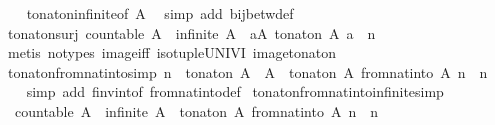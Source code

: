\begin{isabellebody}
%
\isadelimproof
\ \ %
\endisadelimproof
%
\isatagproof
{}\isamarkupfalse%
\ to{\isacharunderscore}nat{\isacharunderscore}on{\isacharunderscore}infinite{\isacharbrackleft}of\ A{\isacharbrackright}\ \isamarkupfalse%
\ {\isacharparenleft}simp\ add{\isacharcolon}\ bij{\isacharunderscore}betw{\isacharunderscore}def{\isacharparenright}%
\endisatagproof
{\isafoldproof}%
%
\isadelimproof
\isanewline
%
\endisadelimproof
\isanewline
{}\isamarkupfalse%
\ to{\isacharunderscore}nat{\isacharunderscore}on{\isacharunderscore}surj{\isacharcolon}\ {\isachardoublequoteopen}countable\ A\ {\isasymLongrightarrow}\ infinite\ A\ {\isasymLongrightarrow}\ {\isasymexists}a{\isasymin}A{\isachardot}\ to{\isacharunderscore}nat{\isacharunderscore}on\ A\ a\ {\isacharequal}\ n{\isachardoublequoteclose}\isanewline
%
\isadelimproof
\ \ %
\endisadelimproof
%
\isatagproof
{}\isamarkupfalse%
\ {\isacharparenleft}metis\ {\isacharparenleft}no{\isacharunderscore}types{\isacharparenright}\ image{\isacharunderscore}iff\ iso{\isacharunderscore}tuple{\isacharunderscore}UNIV{\isacharunderscore}I\ image{\isacharunderscore}to{\isacharunderscore}nat{\isacharunderscore}on{\isacharparenright}%
\endisatagproof
{\isafoldproof}%
%
\isadelimproof
\isanewline
%
\endisadelimproof
\isanewline
{}\isamarkupfalse%
\ to{\isacharunderscore}nat{\isacharunderscore}on{\isacharunderscore}from{\isacharunderscore}nat{\isacharunderscore}into{\isacharbrackleft}simp{\isacharbrackright}{\isacharcolon}\ {\isachardoublequoteopen}n\ {\isasymin}\ to{\isacharunderscore}nat{\isacharunderscore}on\ A\ {\isacharbackquote}\ A\ {\isasymLongrightarrow}\ to{\isacharunderscore}nat{\isacharunderscore}on\ A\ {\isacharparenleft}from{\isacharunderscore}nat{\isacharunderscore}into\ A\ n{\isacharparenright}\ {\isacharequal}\ n{\isachardoublequoteclose}\isanewline
%
\isadelimproof
\ \ %
\endisadelimproof
%
\isatagproof
{}\isamarkupfalse%
\ {\isacharparenleft}simp\ add{\isacharcolon}\ f{\isacharunderscore}inv{\isacharunderscore}into{\isacharunderscore}f\ from{\isacharunderscore}nat{\isacharunderscore}into{\isacharunderscore}def{\isacharparenright}%
\endisatagproof
{\isafoldproof}%
%
\isadelimproof
\isanewline
%
\endisadelimproof
\isanewline
{}\isamarkupfalse%
\ to{\isacharunderscore}nat{\isacharunderscore}on{\isacharunderscore}from{\isacharunderscore}nat{\isacharunderscore}into{\isacharunderscore}infinite{\isacharbrackleft}simp{\isacharbrackright}{\isacharcolon}\isanewline
\ \ {\isachardoublequoteopen}countable\ A\ {\isasymLongrightarrow}\ infinite\ A\ {\isasymLongrightarrow}\ to{\isacharunderscore}nat{\isacharunderscore}on\ A\ {\isacharparenleft}from{\isacharunderscore}nat{\isacharunderscore}into\ A\ n{\isacharparenright}\ {\isacharequal}\ n{\isachardoublequoteclose}\isanewline

\end{isabellebody}
